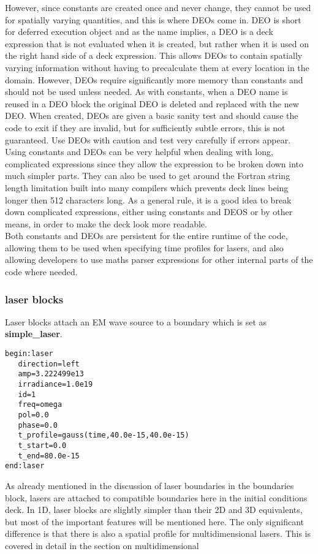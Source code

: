 \documentclass[12pt,a4paper]{article}
\newcommand{\boxverbatim}[1]{\begin{Verbatim}[obeytabs=true,frame=single,
  framerule=0.5mm,rulecolor=\color{warwickmid},formatcom=\color{black},label=#1]}
\newcommand{\inlineemph}[1]{{\color{warwicklight} \bf{#1}}}
\newcommand{\EPOCH}{{\color{warwickdark}\fontfamily{phv}\selectfont{EPOCH}}}
\begin{document}
However, since constants are created once and never change, they cannot be used
for spatially varying quantities, and this is where DEOs come in. DEO is short
for deferred execution object and as the name implies, a DEO is a deck
expression that is not evaluated when it is created, but rather when it is used
on the right hand side of a deck expression. This allows DEOs to contain
spatially varying information without having to precalculate them at every
location in the domain. However, DEOs require significantly more memory than
constants and should not be used unless needed. As with constants, when a DEO
name is reused in a DEO block the original DEO is deleted and replaced with the
new DEO. When created, DEOs are given a basic sanity test and should cause the
code to exit if they are invalid, but for sufficiently subtle errors, this is
not guaranteed. Use DEOs with caution and test very carefully if errors
appear.\\

Using constants and DEOs can be very helpful when dealing with long,
complicated expressions since they allow the expression to be broken down into
much simpler parts. They can also be used to get around the Fortran string
length limitation built into many compilers which prevents deck lines being
longer then 512 characters long. As a general rule, it is a good idea to break
down complicated expressions, either using constants and DEOS or by other
means, in order to make the deck look more readable.\\

Both constants and DEOs are persistent for the entire runtime of the code,
allowing them to be used when specifying time profiles for lasers, and also
allowing developers to use maths parser expressions for other internal parts of
the code where needed.

\subsubsection{\inlineemph{laser} blocks}
Laser blocks attach an EM wave source to a boundary which is set as
\inlineemph{simple\_laser}.

\boxverbatim{laser block}
begin:laser
   direction=left
   amp=3.222499e13
   irradiance=1.0e19
   id=1
   freq=omega
   pol=0.0
   phase=0.0
   t_profile=gauss(time,40.0e-15,40.0e-15)
   t_start=0.0
   t_end=80.0e-15
end:laser
\end{Verbatim}

As already mentioned in the discussion of laser boundaries in the boundaries
block, lasers are attached to compatible boundaries here in the initial
conditions deck. In 1D, laser blocks are slightly simpler than their 2D and 3D
equivalents, but most of the important features will be mentioned here. The
only significant difference is that there is also a spatial profile for
multidimensional lasers. This is covered in detail in the section on
multidimensional {\EPOCH}\\
\end{document}
